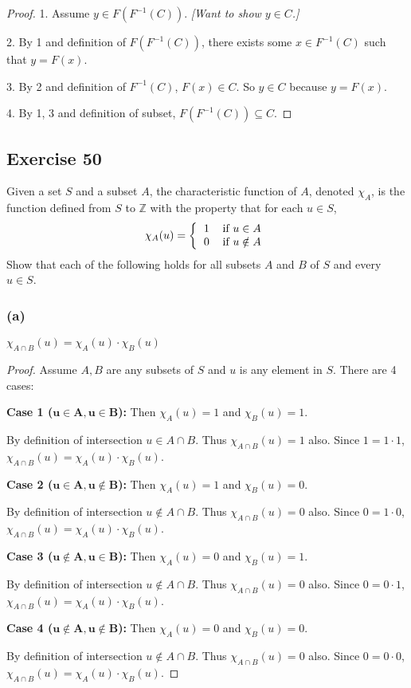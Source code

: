 \documentclass[14pt]{extarticle}
\newcommand{\Z}{\mathbb{Z}}
\begin{document}
\begin{proof}
    1. Assume \(y \in F(F^{-1}(C))\). {\it [Want to show \(y \in C\).]}

    2. By 1 and definition of \(F(F^{-1}(C))\), there exists some \(x \in F^{-1}(C)\) such that \(y = F(x)\).

    3. By 2 and definition of \(F^{-1}(C)\), \(F(x) \in C\). So $y \in C$ because $y = F(x)$.

    4. By 1, 3 and definition of subset, \(F(F^{-1}(C)) \subseteq C\).
\end{proof}

\subsection{Exercise 50}
Given a set $S$ and a subset $A$, the characteristic function of $A$, denoted $\chi_A$, is the function defined
from $S$ to $\Z$ with the property that for each $u \in S$,
\[
    \chi_A(u) =
    \left\{
    \begin{tabular}{lr}
        \(1\) & if \(u \in A\)    \\
        \(0\) & if \(u \notin A\)
    \end{tabular}
    \right.
\]
Show that each of the following holds for all subsets $A$ and $B$ of $S$ and every $u \in S$.

\subsubsection{(a)}
\(\chi_{A \cap B}(u) = \chi_A(u) \cdot \chi_B(u)\)

\begin{proof}
    Assume $A, B$ are any subsets of $S$ and $u$ is any element in $S$. There are 4 cases:

    {\bf Case 1 (\(\bm{u \in A, u \in B}\)):} Then \(\chi_A(u) = 1 \) and \(\chi_B(u) = 1\).

    By definition of intersection \(u \in A \cap B\). Thus
    \(\chi_{A \cap B}(u) = 1\) also. Since $1 = 1 \cdot 1$,
    \(\chi_{A \cap B}(u) = \chi_A(u) \cdot \chi_B(u)\).

        {\bf Case 2 (\(\bm{u \in A, u \notin B}\)):} Then \(\chi_A(u) = 1 \) and \(\chi_B(u) = 0\).

    By definition of intersection \(u \notin A \cap B\). Thus
    \(\chi_{A \cap B}(u) = 0\) also. Since $0 = 1 \cdot 0$,
    \(\chi_{A \cap B}(u) = \chi_A(u) \cdot \chi_B(u)\).

        {\bf Case 3 (\(\bm{u \notin A, u \in B}\)):} Then \(\chi_A(u) = 0 \) and \(\chi_B(u) = 1\).

    By definition of intersection \(u \notin A \cap B\). Thus
    \(\chi_{A \cap B}(u) = 0\) also. Since $0 = 0 \cdot 1$,
    \(\chi_{A \cap B}(u) = \chi_A(u) \cdot \chi_B(u)\).

        {\bf Case 4 (\(\bm{u \notin A, u \notin B}\)):} Then \(\chi_A(u) = 0 \) and \(\chi_B(u) = 0\).

    By definition of intersection \(u \notin A \cap B\). Thus
    \(\chi_{A \cap B}(u) = 0\) also. Since $0 = 0 \cdot 0$,
    \(\chi_{A \cap B}(u) = \chi_A(u) \cdot \chi_B(u)\).
\end{proof}
\end{document}
